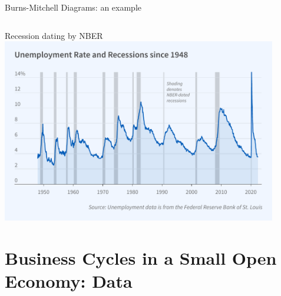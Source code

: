 \documentclass{beamer}
\begin{document}
\begin{frame}{Burns-Mitchell Diagrams: an example}
\begin{columns}
	
	
\end{columns} 
	       

\end{frame}

\begin{frame}{Recession dating by NBER}
  \centering
             \includegraphics[width=0.9\textwidth]{FIGURES/nber_unemp_aft1948}
\end{frame}


\section{Business Cycles in a Small Open Economy: Data}
\end{document}
